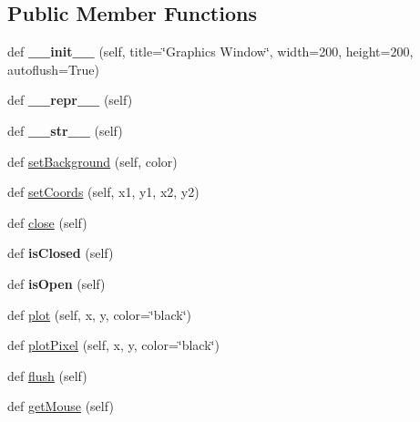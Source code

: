 \subsection*{Public Member Functions}
\begin{DoxyCompactItemize}
\item 
\mbox{\label{classgraphics_1_1_graph_win_abaf17e0a7d09fe97cbb23f03ca545339}} 
def {\bfseries \+\_\+\+\_\+init\+\_\+\+\_\+} (self, title=\char`\"{}Graphics Window\char`\"{}, width=200, height=200, autoflush=True)
\item 
\mbox{\label{classgraphics_1_1_graph_win_afc6d29fa1772c46ec5f1c8917c0dfa36}} 
def {\bfseries \+\_\+\+\_\+repr\+\_\+\+\_\+} (self)
\item 
\mbox{\label{classgraphics_1_1_graph_win_a47a25afdbc0a778241b364142caf862e}} 
def {\bfseries \+\_\+\+\_\+str\+\_\+\+\_\+} (self)
\item 
def \hyperlink{classgraphics_1_1_graph_win_aec4e7921def91d795367eef63054a4df}{set\+Background} (self, color)
\item 
def \hyperlink{classgraphics_1_1_graph_win_a9f5ef08db39c026392b093c2d0a7fbe9}{set\+Coords} (self, x1, y1, x2, y2)
\item 
def \hyperlink{classgraphics_1_1_graph_win_a760daa823490308117c5ce3ea2946bfb}{close} (self)
\item 
\mbox{\label{classgraphics_1_1_graph_win_a77f97f64e8d3dddcef5d3c345ffedc6d}} 
def {\bfseries is\+Closed} (self)
\item 
\mbox{\label{classgraphics_1_1_graph_win_a1a3732b58c2ffc8960be3a9f66bd4df8}} 
def {\bfseries is\+Open} (self)
\item 
def \hyperlink{classgraphics_1_1_graph_win_ac93adafee6ea1c0d9bb32b64cfbe754c}{plot} (self, x, y, color=\char`\"{}black\char`\"{})
\item 
def \hyperlink{classgraphics_1_1_graph_win_a66ef7f9b272d4ef482f834855ccfa0c4}{plot\+Pixel} (self, x, y, color=\char`\"{}black\char`\"{})
\item 
def \hyperlink{classgraphics_1_1_graph_win_a232137e7f2464c4ed6fa4a6fd5022196}{flush} (self)
\item 
def \hyperlink{classgraphics_1_1_graph_win_a4fdf1cf728e9aa559f2912592f66c23e}{get\+Mouse} (self)

\end{DoxyCompactItemize}
